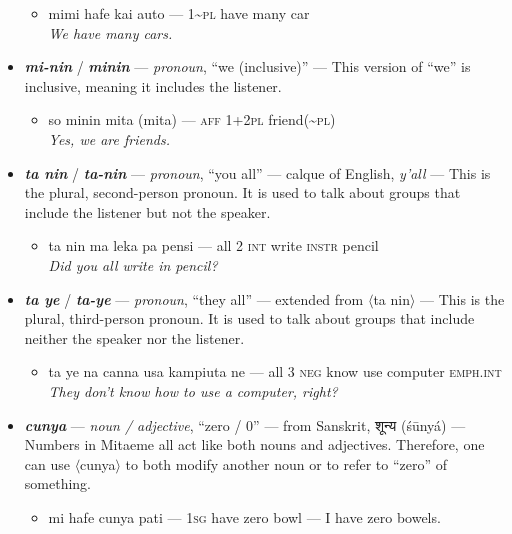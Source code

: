 \documentclass[a4paper, titlepage]{article}
\begin{document}
\begin{itemize}
	\begin{itemize}
		\item mimi hafe kai auto — 1\textasciitilde{}\textsc{pl} have many car \\\textit{We have many cars.}
	\end{itemize}
	\item \textbf{\textit{mi-nin}} /  \textbf{\textit{minin}} — \textit{pronoun}, ``we (inclusive)'' — This version of ``we'' is inclusive, meaning it includes the listener.
	\begin{itemize}
		\item so minin mita (mita) — \textsc{aff 1+2pl} friend(\textasciitilde{}\textsc{pl}) \\\textit{Yes, we are friends.}
	\end{itemize}
	\item \textbf{\textit{ta nin}}  / \textbf{\textit{ta-nin}} — \textit{pronoun}, ``you all'' — calque of English, \textit{y'all} — This is the plural, second-person pronoun. It is used to talk about groups that include the listener but not the speaker.
	\begin{itemize}
		\item ta nin ma leka pa pensi — all 2 \textsc{int} write \textsc{instr} pencil \\\textit{Did you all write in pencil?}
	\end{itemize}
	\item \textbf{\textit{ta ye}}  / \textbf{\textit{ta-ye}} — \textit{pronoun}, ``they all'' — extended from $\langle$ta nin$\rangle$ — This is the plural, third-person pronoun. It is used to talk about groups that include neither the speaker nor the listener.
	\begin{itemize}
		\item ta ye na canna usa kampiuta ne — all 3 \textsc{neg} know use computer \textsc{emph.int} \\\textit{They don't know how to use a computer, right?}
	\end{itemize}
	\item \textbf{\textit{cunya}} —  \textit{noun / adjective}, ``zero / 0'' — from Sanskrit, {\hmfont शून्य} (śūnyá) — Numbers in Mitaeme all act like both nouns and adjectives. Therefore, one can use $\langle$cunya$\rangle$ to both modify another noun or to refer to ``zero'' of something.
	\begin{itemize}
		\item mi hafe cunya pati — \textsc{1sg} have zero bowl — I have zero bowels.
	\end{itemize}

\end{itemize}
\end{document}

